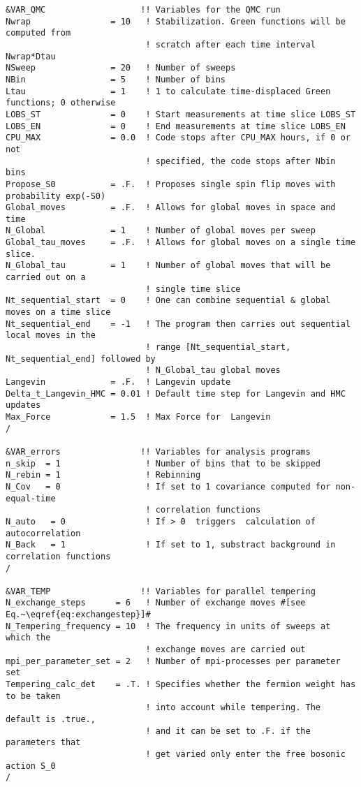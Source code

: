 \begin{lstlisting}[style=fortran,escapechar=\#,breaklines=true]
&VAR_QMC                   !! Variables for the QMC run
Nwrap                = 10   ! Stabilization. Green functions will be computed from 
                            ! scratch after each time interval Nwrap*Dtau
NSweep               = 20   ! Number of sweeps
NBin                 = 5    ! Number of bins
Ltau                 = 1    ! 1 to calculate time-displaced Green functions; 0 otherwise
LOBS_ST              = 0    ! Start measurements at time slice LOBS_ST
LOBS_EN              = 0    ! End measurements at time slice LOBS_EN
CPU_MAX              = 0.0  ! Code stops after CPU_MAX hours, if 0 or not
                            ! specified, the code stops after Nbin bins
Propose_S0           = .F.  ! Proposes single spin flip moves with probability exp(-S0) 
Global_moves         = .F.  ! Allows for global moves in space and time 
N_Global             = 1    ! Number of global moves per sweep 
Global_tau_moves     = .F.  ! Allows for global moves on a single time slice.  
N_Global_tau         = 1    ! Number of global moves that will be carried out on a 
                            ! single time slice
Nt_sequential_start  = 0    ! One can combine sequential & global moves on a time slice
Nt_sequential_end    = -1   ! The program then carries out sequential local moves in the
                            ! range [Nt_sequential_start, Nt_sequential_end] followed by
                            ! N_Global_tau global moves
Langevin             = .F.  ! Langevin update
Delta_t_Langevin_HMC = 0.01 ! Default time step for Langevin and HMC updates
Max_Force            = 1.5  ! Max Force for  Langevin
/

&VAR_errors                !! Variables for analysis programs
n_skip  = 1                 ! Number of bins that to be skipped
N_rebin = 1                 ! Rebinning  
N_Cov   = 0                 ! If set to 1 covariance computed for non-equal-time
                            ! correlation functions
N_auto   = 0                ! If > 0  triggers  calculation of autocorrelation 
N_Back   = 1                ! If set to 1, substract background in correlation functions
/  

&VAR_TEMP                  !! Variables for parallel tempering
N_exchange_steps      = 6   ! Number of exchange moves #[see Eq.~\eqref{eq:exchangestep}]#
N_Tempering_frequency = 10  ! The frequency in units of sweeps at which the
                            ! exchange moves are carried out
mpi_per_parameter_set = 2   ! Number of mpi-processes per parameter set
Tempering_calc_det    = .T. ! Specifies whether the fermion weight has to be taken
                            ! into account while tempering. The default is .true.,
                            ! and it can be set to .F. if the parameters that
                            ! get varied only enter the free bosonic action S_0
/


\end{lstlisting}
